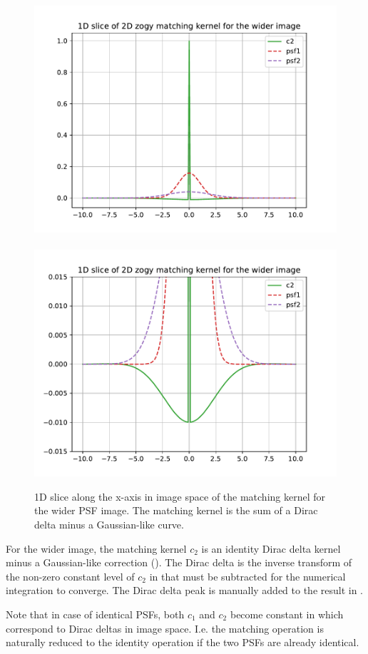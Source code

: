 \begin{figure}
\begin{center}
\includegraphics[width=4.5in]{fig/zogy_theo_Gaussians_img_c2.pdf}\,
\includegraphics[width=4.5in]{fig/zogy_theo_Gaussians_img_c2_tails.pdf}
\end{center}
\caption{\label{fig:theo_Gaussians_img_c2}1D slice along the x-axis in image
  space of the matching kernel for the wider PSF image. The matching kernel
 is the sum of a Dirac delta minus a Gaussian-like curve.}
\end{figure}
%
\par For the wider image, the matching kernel \(c_2\) is an identity Dirac
delta kernel minus a Gaussian-like correction
(). The Dirac delta is the inverse transform
of the non-zero constant level of \(c_2\) in 
that must be subtracted for the numerical integration to converge. The Dirac
delta peak is manually added to the result in .
%
\par Note that in case of identical PSFs, both \(c_1\) and \(c_2\) become
constant in  which correspond to Dirac deltas in
image space. I.e. the matching operation is naturally reduced to the
identity operation if the two PSFs are already identical.
%
\clearpage
%

